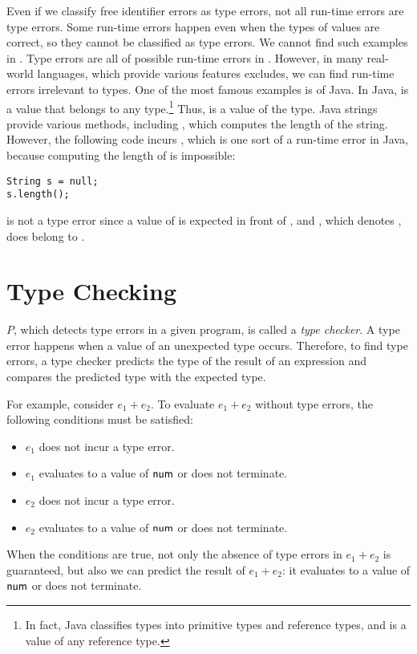 Even if we classify free identifier errors as type errors, not all run-time
errors are type errors. Some run-time errors happen even when the types of
values are correct, so they cannot be classified as type errors. We cannot find
such examples in \plang. Type errors are all of possible run-time errors in
\plang. However, in many real-world languages, which provide various features
\plang excludes, we can find run-time errors irrelevant to types. One of the
most famous examples is  of Java. In Java,
 is a value that belongs to any type.\footnote{In fact, Java
classifies types into primitive types and reference types, and  is a
value of any reference type.} Thus,  is a value of the 
type. Java strings provide various methods, including , which
computes the length of the string. However, the following code incurs
, which is one sort of a run-time error in Java,
because computing the length of  is impossible:

\begin{verbatim}
String s = null;
s.length();
\end{verbatim}

 is not a type error since a value of  is
expected in front of , and , which denotes ,
does belong to .

\section{Type Checking}

$P$, which detects type errors in a given program, is called a \textit{type
checker}. A type error happens when a value of an unexpected
type occurs. Therefore, to find type errors, a type checker predicts the type
of the result of an expression and compares the predicted type with the expected
type.

For example, consider $e_1+e_2$. To evaluate $e_1+e_2$
without type errors, the following conditions must be satisfied:
\begin{itemize}
  \item $e_1$ does not incur a type error.
  \item $e_1$ evaluates to a value of $\textsf{num}$ or does not terminate.
  \item $e_2$ does not incur a type error.
  \item $e_2$ evaluates to a value of $\textsf{num}$ or does not terminate.
\end{itemize}
When the conditions are true, not only the absence of type errors in $e_1+e_2$
is guaranteed, but also we can predict the result of $e_1+e_2$:
it evaluates to a value of $\textsf{num}$ or does not terminate.

